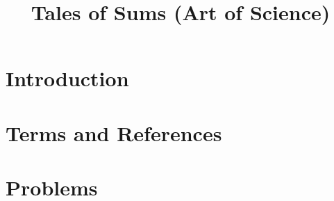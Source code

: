 \documentclass{article}
\title{Tales of Sums (Art of Science)}
\date{\vspace{-5ex}}
\begin{document}
\maketitle



\section{Introduction}


\section{Terms and References}

\section{Problems}

\end{document}
